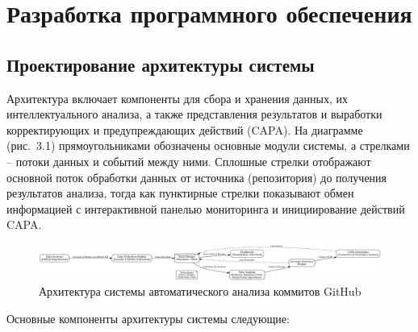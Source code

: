 \chapter{Разработка программного обеспечения} \label{ch3}

\section{Проектирование архитектуры системы} \label{ch3:sec1}

Архитектура включает компоненты для сбора и хранения данных, их интеллектуального анализа, а также представления результатов и выработки корректирующих и предупреждающих действий (CAPA). На диаграмме (рис. 3.1) прямоугольниками обозначены основные модули системы, а стрелками – потоки данных и событий между ними. Сплошные стрелки отображают основной поток обработки данных от источника (репозитория) до получения результатов анализа, тогда как пунктирные стрелки показывают обмен информацией с интерактивной панелью мониторинга и инициирование действий CAPA.

\begin{figure}[ht!]
	\centering
	\includegraphics[width=1\textwidth]{my_folder/images/architect.png}
	\caption{Архитектура системы автоматического анализа коммитов GitHub}
	\label{fig:architecture}
\end{figure}

Основные компоненты архитектуры системы следующие:

